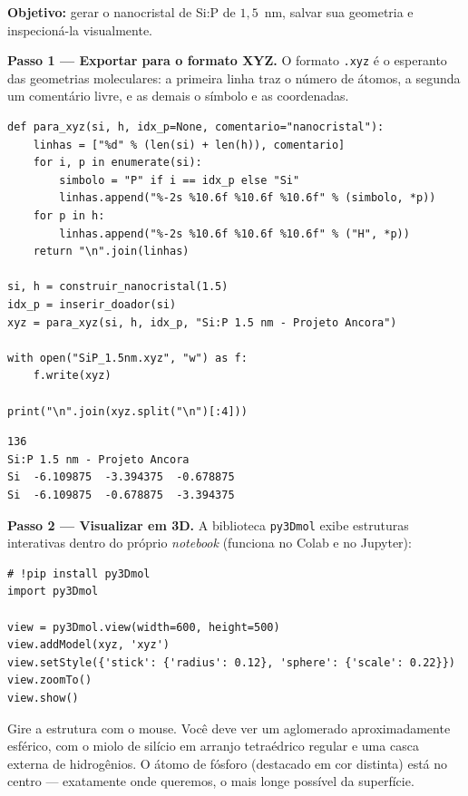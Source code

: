 \documentclass[11pt,a4paper,openany]{book}
\newcommand{\code}[1]{\texttt{#1}}
\begin{document}
\begin{caixamaos}
\textbf{Objetivo:} gerar o nanocristal de Si:P de $1{,}5$~nm, salvar sua geometria
e inspecioná-la visualmente.

\vspace{0.4cm}
\textbf{Passo 1 --- Exportar para o formato XYZ.} O formato \code{.xyz} é o
esperanto das geometrias moleculares: a primeira linha traz o número de átomos, a
segunda um comentário livre, e as demais o símbolo e as coordenadas.

\begin{lstlisting}[style=python]
def para_xyz(si, h, idx_p=None, comentario="nanocristal"):
    linhas = ["%d" % (len(si) + len(h)), comentario]
    for i, p in enumerate(si):
        simbolo = "P" if i == idx_p else "Si"
        linhas.append("%-2s %10.6f %10.6f %10.6f" % (simbolo, *p))
    for p in h:
        linhas.append("%-2s %10.6f %10.6f %10.6f" % ("H", *p))
    return "\n".join(linhas)

si, h = construir_nanocristal(1.5)
idx_p = inserir_doador(si)
xyz = para_xyz(si, h, idx_p, "Si:P 1.5 nm - Projeto Ancora")

with open("SiP_1.5nm.xyz", "w") as f:
    f.write(xyz)

print("\n".join(xyz.split("\n")[:4]))
\end{lstlisting}

\begin{lstlisting}[style=console]
136
Si:P 1.5 nm - Projeto Ancora
Si  -6.109875  -3.394375  -0.678875
Si  -6.109875  -0.678875  -3.394375
\end{lstlisting}

\vspace{0.3cm}
\textbf{Passo 2 --- Visualizar em 3D.} A biblioteca \code{py3Dmol} exibe estruturas
interativas dentro do próprio \emph{notebook} (funciona no Colab e no Jupyter):

\begin{lstlisting}[style=python]
# !pip install py3Dmol
import py3Dmol

view = py3Dmol.view(width=600, height=500)
view.addModel(xyz, 'xyz')
view.setStyle({'stick': {'radius': 0.12}, 'sphere': {'scale': 0.22}})
view.zoomTo()
view.show()
\end{lstlisting}

Gire a estrutura com o mouse. Você deve ver um aglomerado aproximadamente
esférico, com o miolo de silício em arranjo tetraédrico regular e uma casca
externa de hidrogênios. O átomo de fósforo (destacado em cor distinta) está no
centro --- exatamente onde queremos, o mais longe possível da superfície.


\end{caixamaos}
\end{document}
